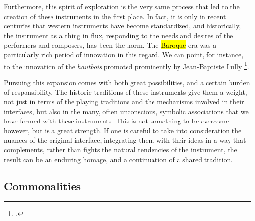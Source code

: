 \documentclass[12pt,twoside,maitrise]{dms_ks}
\theoremstyle{definition}
\begin{document}
Furthermore, this spirit of exploration is the very same process that led to the creation of these instruments in the first place.
In fact, it is only in recent centuries that western instruments have become standardized, and historically, the instrument as a thing in flux, responding to the needs and desires of the performers and composers, has been the norm.
The \hl{Baroque} era was a particularly rich period of innovation in this regard.
We can point, for instance, to the innovation of the \textit{hautbois} promoted prominently by Jean-Baptiste Lully \footcite{wainwright_renaissance_2017}.


Pursuing this expansion comes with both great possibilities, and a certain burden of responsibility.
The historic traditions of these instruments give them a weight, not just in terms of the playing traditions and the mechanisms involved in their interfaces, but also in the many, often unconscious, symbolic associations that we have formed with these instruments.
This is not something to be overcome however, but is a great strength.
If one is careful to take into consideration the nuances of the original interface, integrating them with their ideas in a way that complements, rather than fights the natural tendencies of the instrument, the result can be an enduring homage, and a continuation of a shared tradition.

\subsection{Commonalities}
\end{document}
